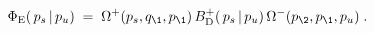 \begin{equation}
\Phi_{\rm E}(\,p_s\,|\,p_u)\;=\;
\Omega^{+}(p_s,q_\1,p_\1)\,B_{\rm D}^+(\,p_s\,|\,p_u)\,
\Omega^{-}(p_\2,p_\1,p_u)\;.
\end{equation}

